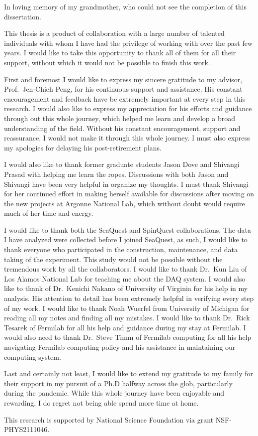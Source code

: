 \documentclass[../main.tex]{subfiles}
\begin{document}
\begin{dedication}
	In loving memory of my grandmother, who could not see the completion of this dissertation.
\end{dedication}

\begin{acknowledgments}
	This thesis is a product of collaboration with a large number of talented
	individuals with whom I have had the privilege of working with over the past
	few years. I would like to take this opportunity to thank all of them for all
	their support, without which it would not be possible to finish this work.

	First and foremost I would like to express my sincere gratitude to my advisor, Prof.~Jen-Chieh Peng, for
	his continuous support and assistance. His constant encouragement and feedback
	have be extremely important at every step in this research.
	I would also like to express my	appreciation for his efforts and guidance
	through out this whole journey, which helped me learn and develop a broad
	understanding of the field.
	Without his constant encouragement, support
	and reassurance, I would not  make it through this whole journey.
	I must also express my apologies for delaying his post-retirement plans.

	I would also like to thank former graduate students Jason Dove and Shivangi
	Prasad with helping me learn the ropes. Discussions with both Jason and
	Shivangi have been very helpful in organize my thoughts.
	I must thank Shivangi for her continued effort in making herself available for
	discussions after moving on the new projects at Argonne National Lab, which
	without doubt would require much of her time and energy.

	I would like to thank both the SeaQuest and SpinQuest collaborations.
	The data I have analyzed were collected before I joined SeaQuest, as such,
	I would like to thank everyone who participated in the construction, maintenance,
	and data taking of the experiment.
	This study would not be possible without the tremendous work by all the collaborators.
	I would like to thank Dr.~Kun Liu of Los Alamos National Lab for teaching me about the DAQ system.
	I would also like to thank of Dr.~Kenichi Nakano of University of Virginia for his help in my analysis.
	His attention to detail has been extremely helpful in verifying every step
	of my work.
	I would like to thank Noah Wuerfel from University of Michigan for reading all
	my notes and finding all my mistakes.
	I would like to thank Dr.~Rick Tesarek of Fermilab for all his help and guidance during my
	stay at Fermilab.
	I would also need to thank Dr.~Steve Timm of Fermilab computing for all his help navigating Fermilab
	computing policy and his assistance in maintaining our computing system.

	Last and certainly not least, I would like to extend my gratitude to my family
	for their support in my pursuit of a Ph.D halfway across the glob, particularly
	during the pandemic. While this whole journey have been enjoyable and rewarding,
	I do regret not being able spend more time at home.

	This research is supported by National Science Foundation via grant NSF-PHYS2111046.

\end{acknowledgments}
\end{document}
